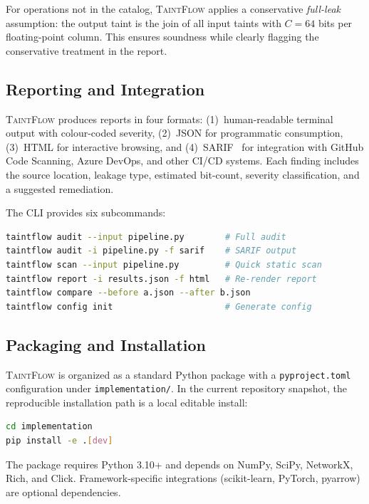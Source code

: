 \documentclass[11pt]{article}
\begin{document}
For operations not in the catalog, \textsc{TaintFlow} applies a
conservative \emph{full-leak} assumption: the output taint is the
join of all input taints with $C = 64$ bits per floating-point column.
This ensures soundness while clearly flagging the conservative
treatment in the report.

\subsection{Reporting and Integration}

\textsc{TaintFlow} produces reports in four formats:
(1)~human-readable terminal output with colour-coded severity,
(2)~JSON for programmatic consumption,
(3)~HTML for interactive browsing, and
(4)~SARIF~\cite{sarif2020} for integration with GitHub Code Scanning,
Azure DevOps, and other CI/CD systems.  Each finding includes the source
location, leakage type, estimated bit-count, severity classification,
and a suggested remediation.

The CLI provides six subcommands:
\begin{lstlisting}[language=bash,caption={CLI usage}]
taintflow audit --input pipeline.py        # Full audit
taintflow audit -i pipeline.py -f sarif    # SARIF output
taintflow scan --input pipeline.py         # Quick static scan
taintflow report -i results.json -f html   # Re-render report
taintflow compare --before a.json --after b.json
taintflow config init                      # Generate config
\end{lstlisting}

\subsection{Packaging and Installation}

\textsc{TaintFlow} is organized as a standard Python package with a
\texttt{pyproject.toml} configuration under \texttt{implementation/}.
In the current repository snapshot, the reproducible installation path
is a local editable install:
\begin{lstlisting}[language=bash]
cd implementation
pip install -e .[dev]
\end{lstlisting}

The package requires Python 3.10+ and depends on NumPy, SciPy,
NetworkX, Rich, and Click.  Framework-specific integrations
(scikit-learn, PyTorch, pyarrow) are optional dependencies.

\end{document}
